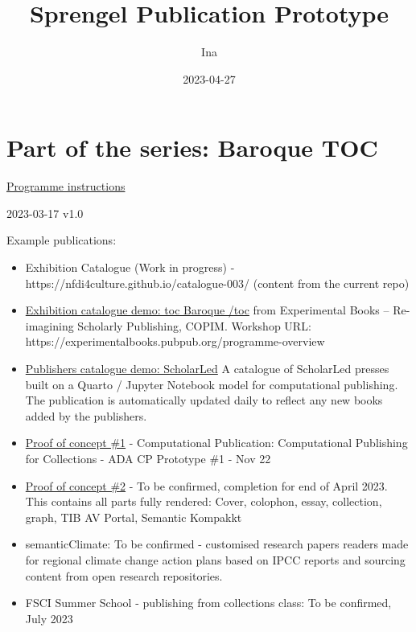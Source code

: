 \documentclass[
  letterpaper,
]{book}
\title{Sprengel Publication Prototype}
\author{Ina}
\date{2023-04-27}
\renewcommand*\contentsname{Table of contents}
\newcommand\contentsname{Table of contents}
\begin{document}
\frontmatter
\maketitle
\ifdefined\Shaded\renewenvironment{Shaded}{\begin{tcolorbox}[interior hidden, breakable, frame hidden, enhanced, boxrule=0pt, sharp corners, borderline west={3pt}{0pt}{shadecolor}]}{\end{tcolorbox}}\fi

\renewcommand*\contentsname{Table of contents}
{
\setcounter{tocdepth}{2}
\tableofcontents
}
\mainmatter
{}

\hypertarget{part-of-the-series-baroque-toc}{%
\chapter{Part of the series: Baroque
TOC}\label{part-of-the-series-baroque-toc}}

\href{https://nfdi4culture.github.io/class-ADA-CP-pipeline/}{Programme
instructions}

2023-03-17 v1.0

Example publications:

\begin{itemize}
\item
  Exhibition Catalogue (Work in progress) -
  https://nfdi4culture.github.io/catalogue-003/ (content from the
  current repo)
\item
  \href{https://nfdi4culture.github.io/experimental-books-workshop/}{Exhibition
  catalogue demo: toc Baroque /toc} from Experimental Books --
  Re-imagining Scholarly Publishing, COPIM. Workshop URL:
  https://experimentalbooks.pubpub.org/programme-overview
\item
  \href{https://simonxix.github.io/scholarled_catalogue/}{Publishers
  catalogue demo: ScholarLed} A catalogue of ScholarLed presses built on
  a Quarto / Jupyter Notebook model for computational publishing. The
  publication is automatically updated daily to reflect any new books
  added by the publishers.
\item
  \href{https://nfdi4culture.github.io/cp4c/}{Proof of concept \#1} -
  Computational Publication: Computational Publishing for Collections -
  ADA CP Prototype \#1 - Nov 22
\item
  \href{https://nfdi4culture.github.io/art_catalogue_test/}{Proof of
  concept \#2} - To be confirmed, completion for end of April 2023. This
  contains all parts fully rendered: Cover, colophon, essay, collection,
  graph, TIB AV Portal, Semantic Kompakkt
\item
  semanticClimate: To be confirmed - customised research papers readers
  made for regional climate change action plans based on IPCC reports
  and sourcing content from open research repositories.
\item
  FSCI Summer School - publishing from collections class: To be
  confirmed, July 2023
\end{itemize}
\end{document}
